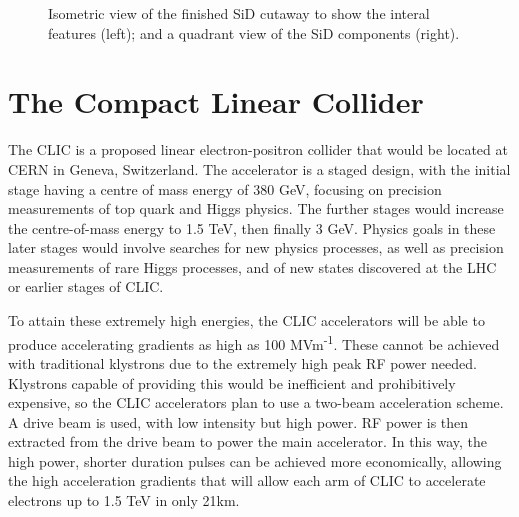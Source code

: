 \begin{figure}[h]%
	\centering
    \qquad
    \caption{Isometric view of the finished \acrshort{SiD} cutaway to show the interal features (left); and a quadrant view of the \acrshort{SiD} components (right).}%
    \label{figure:colliders/ILD/double}%
\end{figure}

\section{The Compact Linear Collider}
The \acrfull{CLIC} is a proposed linear electron-positron collider that would be located at \acrshort{CERN} in Geneva, Switzerland. The accelerator is a staged design, with the initial stage having a centre of mass energy of 380 GeV, focusing on precision measurements of top quark and Higgs physics. The further stages would increase the centre-of-mass energy to 1.5 TeV, then finally 3 GeV. Physics goals in these later stages would involve searches for new physics processes, as well as precision measurements of rare Higgs processes, and of new states discovered at the LHC or earlier stages of \acrshort{CLIC}. 

To attain these extremely high energies, the \acrshort{CLIC} accelerators will be able to produce accelerating gradients as high as 100 MVm\textsuperscript{-1}. These cannot be achieved with traditional klystrons due to the extremely high peak \acrshort{RF} power needed. Klystrons capable of providing this would be inefficient and prohibitively expensive, so the \acrshort{CLIC} accelerators plan to use a two-beam acceleration scheme. A drive beam is used, with low intensity but high power. \acrshort{RF} power is then extracted from the drive beam to power the main accelerator. In this way, the high power, shorter duration pulses can be achieved more economically, allowing the high acceleration gradients that will allow each arm of \acrshort{CLIC} to accelerate electrons up to 1.5 TeV in only 21km.

